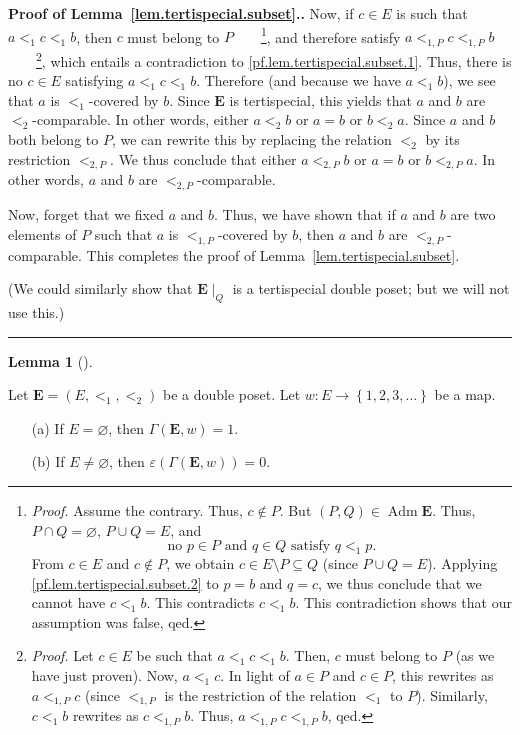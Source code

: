 \documentclass[numbers=enddot,12pt,final,onecolumn,notitlepage,abstracton]{scrartcl}%
\theoremstyle{definition}
\newtheorem{lem}[theo]{Lemma}
\newenvironment{lemma}[1][]
{\begin{lem}[#1]\begin{leftbar}}
{\end{leftbar}\end{lem}}
\newenvironment{proof}[1][Proof]{\noindent\textbf{#1.} }{\ \rule{0.5em}{0.5em}}
\newcommand{\Adm}{\operatorname{Adm}}
\newcommand{\EE}{{\mathbf{E}}}
\begin{document}
\begin{proof}[Proof of Lemma~\ref{lem.tertispecial.subset}.]
Now, if $c \in E$ is such that $a <_1 c <_1 b$, then $c$ must
belong to $P$\ \ \ \ \footnote{\textit{Proof.} Assume the
contrary. Thus, $c \notin P$. But
$\left(P, Q\right) \in \Adm \EE$. Thus, $P \cap Q = \varnothing$,
$P \cup Q = E$, and
\begin{equation}
\text{no } p \in P \text{ and } q \in Q \text{ satisfy }
q <_1 p .
\label{pf.lem.tertispecial.subset.2}
\end{equation}
From $c \in E$ and $c \notin P$, we obtain
$c \in E\setminus P \subseteq Q$ (since $P \cup Q = E$).
Applying \eqref{pf.lem.tertispecial.subset.2} to $p = b$ and
$q = c$, we thus conclude that we cannot have $c <_1 b$.
This contradicts $c <_1 b$. This contradiction shows that our
assumption was false, qed.}, and therefore satisfy
$a <_{1,P} c <_{1,P} b$\ \ \ \ \footnote{\textit{Proof.}
Let $c \in E$ be such that $a <_1 c <_1 b$. Then, $c$ must
belong to $P$ (as we have just proven). Now, $a <_1 c$. In
light of $a \in P$ and $c \in P$, this rewrites as
$a <_{1,P} c$ (since $<_{1,P}$ is the restriction of the
relation $<_1$ to $P$). Similarly, $c <_1 b$ rewrites as
$c <_{1,P} b$. Thus, $a <_{1,P} c <_{1,P} b$, qed.},
which entails a
contradiction to \eqref{pf.lem.tertispecial.subset.1}. Thus, there
is no $c \in E$ satisfying $a <_1 c <_1 b$. Therefore (and
because we have $a <_1 b$), we see that $a$ is $<_1$-covered
by $b$. Since $\EE$ is tertispecial,
this yields that $a$ and $b$ are $<_2$-comparable. In other
words, either $a <_2 b$ or $a = b$ or $b <_2 a$. Since $a$ and
$b$ both belong to $P$, we can rewrite this by replacing the
relation $<_2$ by its restriction $<_{2,P}$. We thus conclude
that either $a <_{2,P} b$ or $a = b$ or $b <_{2,P} a$. In other
words, $a$ and $b$ are $<_{2,P}$-comparable.

Now, forget that we fixed $a$ and $b$.
Thus, we have shown that if $a$ and $b$ are two elements
of $P$ such that $a$ is $<_{1,P}$-covered by $b$, then $a$ and
$b$ are $<_{2,P}$-comparable. This completes the proof of
Lemma~\ref{lem.tertispecial.subset}.

(We could similarly show that $\EE\mid_Q$ is a tertispecial
double poset; but we will not use this.)
\end{proof}

\begin{lemma}
\label{lem.Gammaw.empty}Let $\EE = \left( E, <_1, <_2 \right)$ be a
double poset.
Let $w : E \rightarrow \left\{ 1, 2, 3, \ldots \right\}$ be a map.

\begin{enumerate}
\item[(a)] If $E = \varnothing$, then $\Gamma \left( \EE , w \right) = 1$.

\item[(b)] If $E \neq \varnothing$, then
$\varepsilon \left( \Gamma \left( \EE, w \right) \right) = 0$.
\end{enumerate}
\end{lemma}
\end{document}
